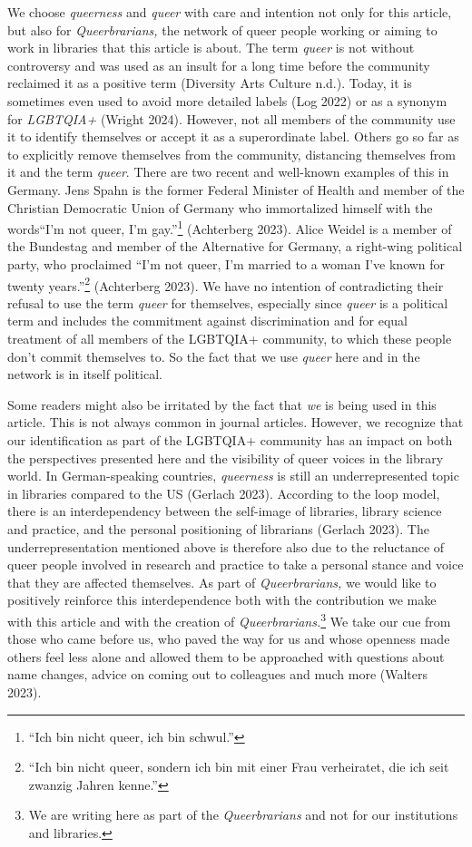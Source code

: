 \documentclass[a4paper,
fontsize=11pt,
oneside,
numbers=noperiodatend,
parskip=half-,
bibliography=totoc,
final
]{scrartcl}
\begin{document}
We choose \emph{queerness} and \emph{queer} with care and intention not
only for this article, but also for \emph{Queerbrarians,} the network of
queer people working or aiming to work in libraries that this article is
about. The term \emph{queer} is not without controversy and was used as
an insult for a long time before the community reclaimed it as a
positive term (Diversity Arts Culture n.d.). Today, it is sometimes even
used to avoid more detailed labels (Log 2022) or as a synonym for
\emph{LGBTQIA+} (Wright 2024). However, not all members of the community
use it to identify themselves or accept it as a superordinate label.
Others go so far as to explicitly remove themselves from the community,
distancing themselves from it and the term \emph{queer}. There are two
recent and well-known examples of this in Germany. Jens Spahn is the
former Federal Minister of Health and member of the Christian Democratic
Union of Germany who immortalized himself with the words\enquote{I'm not queer, I'm gay.}\footnote{\enquote{Ich
  bin nicht queer, ich bin schwul.}} (Achterberg 2023). Alice Weidel is
a member of the Bundestag and member of the Alternative for Germany, a
right-wing political party, who proclaimed \enquote{I'm not
queer, I'm married to a woman I've known
for twenty years.}\footnote{\enquote{Ich bin nicht queer, sondern ich
  bin mit einer Frau verheiratet, die ich seit zwanzig Jahren kenne.}}
(Achterberg 2023). We have no intention of contradicting their refusal
to use the term \emph{queer} for themselves, especially since
\emph{queer} is a political term and includes the commitment against
discrimination and for equal treatment of all members of the LGBTQIA+
community, to which these people don't commit themselves
to. So the fact that we use \emph{queer} here and in the network is in
itself political.

Some readers might also be irritated by the fact that \emph{we} is being
used in this article. This is not always common in journal articles.
However, we recognize that our identification as part of the LGBTQIA+
community has an impact on both the perspectives presented here and the
visibility of queer voices in the library world. In German-speaking
countries, \emph{queerness} is still an underrepresented topic in
libraries compared to the US (Gerlach 2023). According to the loop
model, there is an interdependency between the self-image of libraries,
library science and practice, and the personal positioning of librarians
(Gerlach 2023). The underrepresentation mentioned above is therefore
also due to the reluctance of queer people involved in research and
practice to take a personal stance and voice that they are affected
themselves. As part of \emph{Queerbrarians,} we would like to positively
reinforce this interdependence both with the contribution we make with
this article and with the creation of \emph{Queerbrarians.}\footnote{We
  are writing here as part of the \emph{Queerbrarians} and not for our
  institutions and libraries.} We take our cue from those who came
before us, who paved the way for us and whose openness made others feel
less alone and allowed them to be approached with questions about name
changes, advice on coming out to colleagues and much more (Walters
2023).
\end{document}
